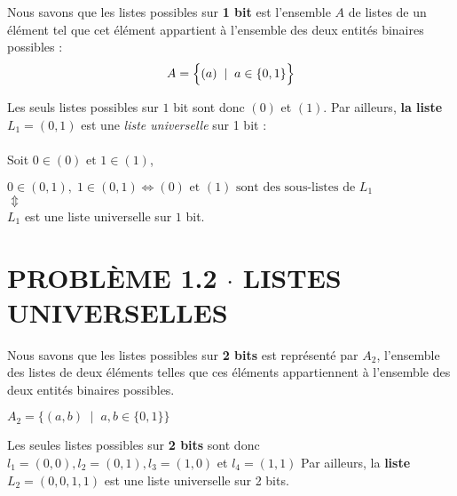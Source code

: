 \documentclass[8pt]{report}
\begin{document}
\noindent Nous savons que les listes possibles sur \textbf{1 bit} est l'ensemble $A$ de listes de un élément 
              tel que cet élément appartient à l'ensemble des deux entités binaires possibles :
              \[ A = \Bigl\{ (a) \;\; | \;\; a \in \{0,1\} \Bigr\} \]
              \begin{Reponse}{}{}
                  Les seuls listes possibles sur $1$ bit sont donc $(0)$ et $(1)$. Par ailleurs, \textbf{la liste} 
                  $L_1 = (0,1)$ est une \textit{liste universelle} sur 1 bit : 
                  \\\\ Soit $0 \in (0) \text{ et } 1 \in (1)$,
                  \begin{center} 
                      $0 \in (0, 1), \; 1 \in (0,1) \Leftrightarrow (0) \text{ et } (1) 
                      \text{ sont des sous-listes de } L_1$ 
                      \\ 
                      $\Updownarrow$  
                      \\ 
                      $L_1$ est une liste universelle sur $1$ bit.  
                  \end{center}
              \end{Reponse}
              \section*{\textnormal{PROBLÈME 1.2 \;\;\;\; $\cdot$ \;\;\;\; LISTES UNIVERSELLES}} 

              \noindent Nous savons que les listes possibles sur \textbf{2 bits} est représenté par  
              $A_2$, l'ensemble des listes de deux éléments telles que ces éléments appartiennent 
               à l'ensemble des deux entités binaires possibles. 
            \begin{center}
                    $ A_2 = \{ (a,b) \;\; | \;\; a, b \in \{0, 1\} \}$ \\
            \end{center}

            \begin{Reponse}{}{}
                Les seules listes possibles sur \textbf{2  bits} sont donc $l_1 = (0,0), l_2 = (0, 1), l_3 = (1, 0)$ et 
                $l_4 = (1,1)$ Par ailleurs, la \textbf{liste} $L_2 = (0, 0, 1, 1)$ est une  
                liste universelle sur 2 bits.  
            \end{Reponse}

 
\end{document}

